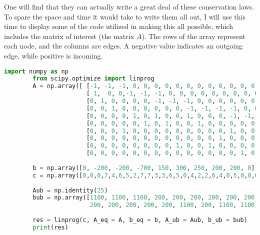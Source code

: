 \documentclass[11pt]{article}
\begin{document}
    One will find that they can actually write a great deal of these
    conservation laws. To spare the space and time it would take to write them
    all out, I will use this time to display some of the code utilized in
    making this all possible, which includes the matrix of interest (the matrix
    $A$). The rows of the array represent each node, and the columns are edges. 
    A negative value indicates an outgoing edge, while positive is incoming. \\
    \begin{lstlisting}[style=mystyle, linewidth=0.94\linewidth,
    language=Python, gobble=8, caption=The Program]
        import numpy as np
        from scipy.optimize import linprog
        A = np.array([ [-1, -1, -1, 0, 0, 0, 0, 0, 0, 0, 0, 0, 0, 0, 0, 0, 0, 0, 0, 0, 0, 0, 0, 0, 0],
                       [ 1,  0, 0,-1, -1, -1, 0, 0, 0, 0, 0, 0, 0, 0, 0, 0, 0, 0, 0, 0, 0, 0, 0, 0, 0],
                       [0, 1, 0, 0, 0, 0, -1, -1, -1, 0, 0, 0, 0, 0, 0, 0, 0, 0, 0, 0, 0, 0, 0, 0, 0],
                       [0, 0, 1, 0, 0, 0, 0, 0, 0, -1, -1, -1, -1, 0, 0, 0, 0, 0, 0, 0, 0, 0, 0, 0, 0],
                       [0, 0, 0, 0, 1, 0, 1, 0, 0, 1, 0, 0, 0, -1, -1, -1, -1, 1, 0, 0, 0, 0, 0, 0, 0],
                       [0, 0, 0, 0, 0, 1, 0, 1, 0, 0, 1, 0, 0, 0, 0, 0, 1, -1, -1, -1, -1, -1, 0, 0, 0],
                       [0, 0, 0, 1, 0, 0, 0, 0, 0, 0, 0, 0, 0, 1, 0, 0, 0, 0, 1, 0, 0, 0, -1, 0, 0],
                       [0, 0, 0, 0, 0, 0, 0, 0, 0, 0, 0, 0, 1, 0, 0, 0, 1, 0, 0, 1, 0, 0, 0, -1, 0],
                       [0, 0, 0, 0, 0, 0, 0, 0, 1, 0, 0, 1, 0, 0, 0, 0, 0, 0, 0, 0, 0, 1, 0, 0, -1],
                       [0, 0, 0, 0, 0, 0, 0, 0, 0, 0, 0, 0, 0, 0, 1, 0, 0, 0, 0, 0, 1, 0, 1, 1, 1]])
        
        b = np.array([0, -200, -200, -700, 150, 300, 250, 200, 200, 0])
        c = np.array([0,0,0,7,4,6,5,2,7,7,3,3,6,5,0,4,2,2,6,4,0,5,0,0,0])
        
        Aub = np.identity(25)
        bub = np.array([1100, 1100, 1100, 200, 200, 200, 200, 200, 200, 200, 200, 200, 200, 200, 1100, 
                        200, 200, 200, 200, 200, 1100, 200, 1100, 1100, 1100])
        
        res = linprog(c, A_eq = A, b_eq = b, A_ub = Aub, b_ub = bub)
        print(res)
    \end{lstlisting}
\end{document}
